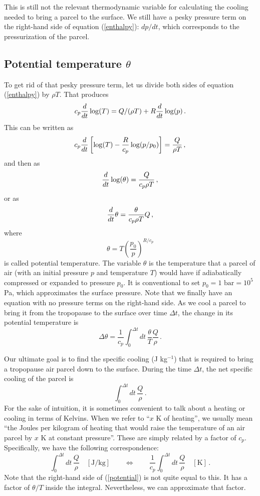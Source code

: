 \documentclass[12pt]{article}
\begin{document}
This is still not the relevant thermodynamic variable for calculating the cooling needed to bring a parcel to the surface.  We still have a pesky pressure term on the right-hand side of equation (\ref{enthalpy}): $dp/dt$, which corresponds to the pressurization of the parcel.


\subsection{Potential temperature $\theta$}


To get rid of that pesky pressure term, let us divide both sides of equation (\ref{enthalpy}) by $\rho T$.  That produces
\[
c_p {\frac{d}{dt}} \log(T) = Q/(\rho T) + R {\frac{d}{dt}} \log(p) \, .
\]
This can be written as
\[
c_p {\frac{d}{dt}} \left[ \log(T) - \frac{R}{c_p} \log(p/p_0) \right] = \frac{Q}{\rho T} \, ,
\]
and then as
\[
{\frac{d}{dt}} \log(\theta) = \frac{Q}{c_p \rho T} \, ,
\]
or as 
\begin{equation}
{\frac{d}{dt}} \theta = \frac{\theta}{c_p \rho T} Q \, , \label{potential}
\end{equation}
where
\begin{equation}
\theta = T \left( \frac{p_0}{p} \right)^{R/c_p} \label{potdef}
\end{equation}
is called potential temperature.  The variable $\theta$ is the temperature that a parcel of air (with an initial pressure $p$ and temperature $T$) would have if adiabatically compressed or expanded to pressure $p_0$.  It is conventional to set $p_0 = 1 \text{ bar} = 10^5$ Pa, which approximates the surface pressure.  Note that we finally have an equation with no pressure terms on the right-hand side.  As we cool a parcel to bring it from the tropopause to the surface over time $\Delta t$, the change in its potential temperature is
\[
\Delta \theta = \frac{1}{c_p} \int_0^{\Delta t} dt \, \frac{\theta}{T} \frac{Q}{\rho} \, .
\]


Our ultimate goal is to find the specific cooling (J kg$^{-1}$) that is required to bring a tropopause air parcel down to the surface.  During the time $\Delta t$, the net specific cooling of the parcel is 
\[
\int_0^{\Delta t} dt \, \frac{Q}{\rho} \, .
\]
For the sake of intuition, it is sometimes convenient to talk about a heating or cooling in terms of Kelvins.  When we refer to ``$x$ K of heating'', we usually mean ``the Joules per kilogram of heating that would raise the temperature of an air parcel by $x$ K at constant pressure''.  These are simply related by a factor of $c_p$.  Specifically, we have the following correspondence:
\[
\int_0^{\Delta t} dt\, \frac{Q}{\rho} \quad [\text{J/kg}] \qquad \Longleftrightarrow \qquad \frac{1}{c_p} \int_0^{\Delta t} dt \, \frac{Q}{\rho} \quad [\text{K}] \, .
\]
Note that the right-hand side of (\ref{potential}) is not quite equal to this.  It has a factor of $\theta/T$ inside the integral.  Nevertheless, we can approximate that factor.
 
\end{document}
